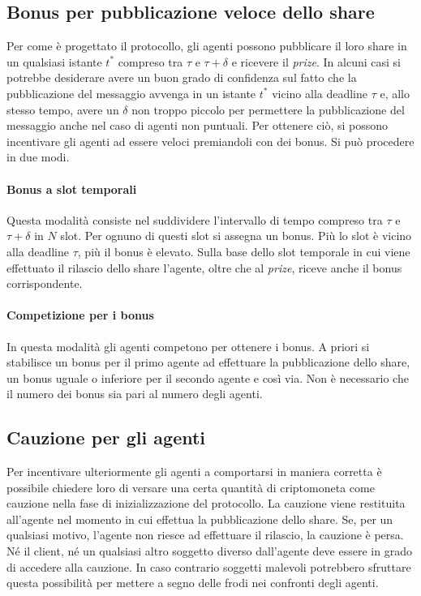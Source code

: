 \subsection{Bonus per pubblicazione veloce dello share}
Per come è progettato il protocollo, gli agenti possono pubblicare il loro share in un qualsiasi istante
$ t^* $ compreso tra 
$ \tau $ e $ \tau + \delta $ e ricevere il \textit{prize}. In alcuni casi si potrebbe desiderare avere un buon grado di confidenza sul fatto che la pubblicazione del messaggio avvenga in un istante $ t^* $ vicino alla deadline $ \tau $ e, allo stesso tempo, avere un $ \delta $ non troppo piccolo per permettere la pubblicazione del messaggio anche nel caso di agenti non puntuali. Per ottenere ciò, si possono incentivare gli agenti ad essere veloci premiandoli con dei bonus. Si può procedere in due modi.
\paragraph{Bonus a slot temporali} Questa modalità consiste nel suddividere l'intervallo di tempo compreso tra $ \tau $ e $ \tau + \delta $ in $ N $ slot. Per ognuno di questi slot si assegna un bonus. Più lo slot
è vicino alla deadline $ \tau $, più il bonus è elevato. Sulla base dello slot temporale in cui viene effettuato il rilascio dello share l'agente, oltre che al \textit{prize}, riceve anche il bonus corrispondente.
\paragraph{Competizione per i bonus} In questa modalità gli agenti competono per ottenere i bonus. A priori si stabilisce un bonus per il primo agente ad effettuare la pubblicazione dello share, un bonus uguale o inferiore per il secondo agente e così via.
Non è necessario che il numero dei bonus sia pari al numero degli agenti.

\subsection{Cauzione per gli agenti}
Per incentivare ulteriormente gli agenti a comportarsi in maniera corretta è possibile chiedere loro di versare una certa quantità di criptomoneta come cauzione nella fase di inizializzazione del protocollo. La cauzione viene restituita all'agente nel momento in cui effettua la pubblicazione dello share. Se, per un qualsiasi motivo, l'agente non riesce ad effettuare il rilascio, la cauzione è persa. Né il client, né un qualsiasi altro soggetto diverso dall'agente deve essere in grado di accedere alla cauzione. In caso contrario soggetti malevoli potrebbero sfruttare questa possibilità per mettere a segno delle frodi nei confronti degli agenti. 